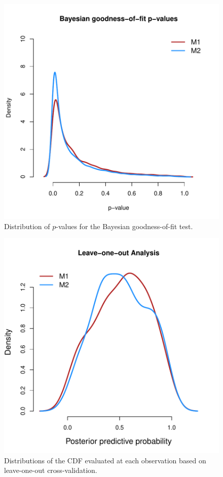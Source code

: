 \documentclass{asaproc}
\begin{document}
\begin{figure}
\centering
\includegraphics[scale=0.55]{figs/gof.pdf}
\caption{Distribution of $p$-values for the Bayesian goodness-of-fit test.}
\label{gof}
\end{figure}

\begin{figure}
\centering
\includegraphics[scale=0.55]{figs/loo.pdf}
\caption{Distributions of the CDF evaluated at each observation based on leave-one-out cross-validation.}
\label{loo}
\end{figure}
\end{document}
